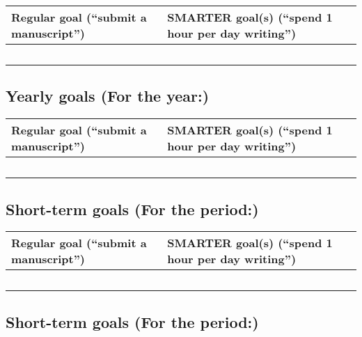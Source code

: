 \documentclass[letterpaper,oneside,11pt,article, portrait]{memoir}
\begin{document}
\begin{center}
 \begin{tabular}{|p{2.5in}|p{4in}|}
Regular goal (``submit a manuscript'')& SMARTER goal(s) (``spend 1 hour per day writing'') \\
\hline
\vspace{6in} \ & \\
\hline
\end{tabular}
\end{center}



\subsection{Yearly goals (For the year:\hspace{1in})}

\begin{center}
 \begin{tabular}{|p{2.5in}|p{4in}|}
Regular goal (``submit a manuscript'')& SMARTER goal(s) (``spend 1 hour per day writing'') \\
\hline
\vspace{8in} \ & \\
\hline
\end{tabular}
\end{center}

\clearpage


\subsection{Short-term goals (For the period:\hspace{3in})}

\begin{center}
 \begin{tabular}{|p{2.5in}|p{4in}|}
Regular goal (``submit a manuscript'')& SMARTER goal(s) (``spend 1 hour per day writing'') \\
\hline
\vspace{8in} \ & \\
\hline
\end{tabular}
\end{center}

\clearpage



\subsection{Short-term goals (For the period:\hspace{3in})}
\end{document}
